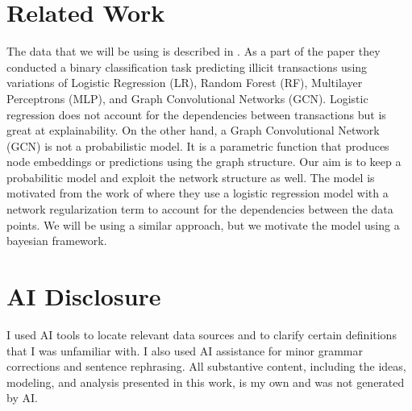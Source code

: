 \documentclass[12pt]{amsart}
\begin{document}
\section{Related Work}
The data that we will be using is described in \cite{weber2019antimoneylaunderingbitcoinexperimenting}. As a part of the paper they conducted a binary classification task predicting illicit transactions using variations of Logistic Regression (LR), Random Forest (RF), Multilayer Perceptrons (MLP), and Graph Convolutional Networks (GCN). Logistic regression does not account for the dependencies between transactions but is great at explainability. On the other hand, a Graph Convolutional Network (GCN) is not a probabilistic model. It is a parametric function that produces node embeddings or predictions using the graph structure. Our aim is to keep a probabilitic model and exploit the network structure as well. The model is motivated from the work of \cite{mukherjee2024logistic,daskalakis2020logistic} where they use a logistic regression model with a network regularization term to account for the dependencies between the data points. We will be using a similar approach, but we motivate the model using a bayesian framework.
\section{AI Disclosure}
I used AI tools to locate relevant data sources and to clarify certain definitions that I was unfamiliar with. I also used AI assistance for minor grammar corrections and sentence rephrasing. All substantive content, including the ideas, modeling, and analysis presented in this work, is my own and was not generated by AI.


\end{document}
